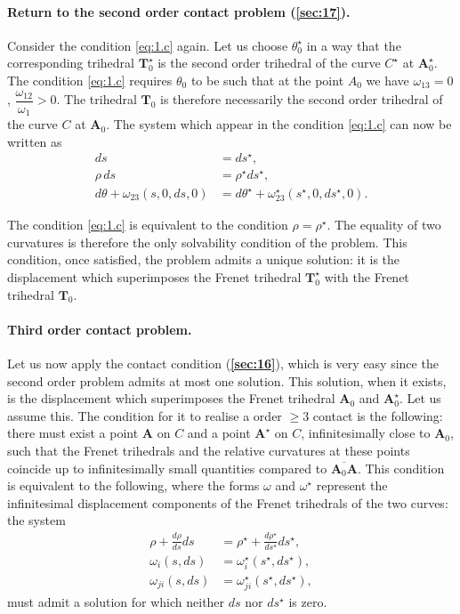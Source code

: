 \documentclass[leqno,11pt]{book}
\numberwithin{equation}{chapter}
\theoremstyle{shape1}
\theoremstyle{shapesmall}
\newcommand{\fsref}[1]{{\rm\textsection\textbf{\ref{sec:#1}}}}
\newcommand{\str}{^{\star}}
\begin{document}
\paragraph{Return to the second order contact problem (\fsref{17}).}
\label{sec:19}
Consider the condition \eqref{eq:1.c} again. Let us choose $\theta\str_{0}$ in a way that the corresponding trihedral $\mathbf{T}\str_{0}$ is the second order trihedral of the curve $C\str$ at $\mathbf{A}\str_{0}$. The condition \eqref{eq:1.c} requires $\theta_{0}$ to be such that at the point $A_{0}$ we have $\omega_{13}=0$, $\dfrac{\omega_{12}}{\omega_{1}}>0$. The trihedral $\mathbf{T}_{0}$ is therefore necessarily the second order trihedral of the curve $C$ at $\mathbf{A}_{0}$. The system which appear in the condition \eqref{eq:1.c} can now be written as
\begin{align*}
  ds&=ds\str,\\
  \rho\,ds&=\rho\str ds\str,\\
  d\theta+\omega_{23}(s,0,ds,0)&=d\theta\str+\omega_{23}\str(s\str,0,ds\str,0).
\end{align*}

The condition \eqref{eq:1.c} is equivalent to the condition $\rho=\rho\str$. The equality of two curvatures is therefore the only solvability condition of the problem. This condition, once satisfied, the problem admits a unique solution: it is the displacement which superimposes the Frenet trihedral $\mathbf{T}\str_{0}$ with the Frenet trihedral $\mathbf{T}_{0}$.

\paragraph{Third order contact problem.}
\label{sec:20}
Let us now apply the contact condition (\fsref{16}), which is very easy since the second order problem admits at most one solution. This solution, when it exists, is the displacement which superimposes the Frenet trihedral $\mathbf{A}_{0}$ and $\mathbf{A}\str_{0}$. Let us assume this. The condition for it to realise a order $\ge 3$ contact is the following: there must exist a point $\mathbf{A}$ on $C$ and a point $\mathbf{A}\str$ on $C$, infinitesimally close to $\mathbf{A}_{0}$, such that the Frenet trihedrals and the relative curvatures at these points coincide up to infinitesimally small quantities compared to $\overline{\mathbf{A}_{0}\mathbf{A}}$. This condition is equivalent to the following, where the forms $\omega$ and $\omega\str$ represent the infinitesimal displacement components of the Frenet trihedrals of the two curves: the system
\begin{align*}
  \rho+\frac{d\rho}{ds}ds&=\rho\str+\frac{d\rho\str}{ds\str}ds\str,\\
  \omega_{i}(s,ds)&=\omega\str_{i}(s\str,ds\str),\\
  \omega_{ji}(s,ds)&=\omega\str_{ji}(s\str,ds\str),
\end{align*}
must admit a solution for which neither $ds$ nor $ds\str$ is zero.
\end{document}
